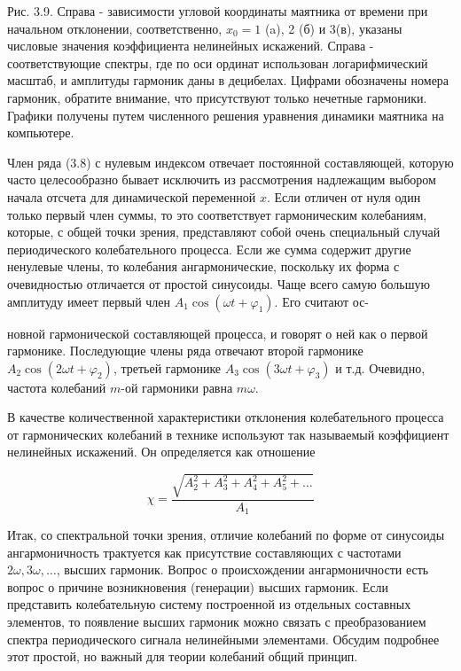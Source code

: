 \documentclass[10pt]{article}
\begin{document}
Рис. 3.9. Справа - зависимости угловой координаты маятника от времени при начальном отклонении, соответственно, $x_{0}=1$ (a), 2 (б) и 3(в), указаны числовые значения коэффициента нелинейных искажений. Справа - соответствующие спектры, где по оси ординат использован логарифмический масштаб, и амплитуды гармоник даны в децибелах. Цифрами обозначены номера гармоник, обратите внимание, что присутствуют только нечетные гармоники. Графики получены путем численного решения уравнения динамики маятника на компьютере.

Член ряда (3.8) с нулевым индексом отвечает постоянной составляющей, которую часто целесообразно бывает исключить из рассмотрения надлежащим выбором начала отсчета для динамической переменной $x$. Если отличен от нуля один только первый член суммы, то это соответствует гармоническим колебаниям, которые, с общей точки зрения, представляют собой очень специальный случай периодического колебательного процесса. Если же сумма содержит другие ненулевые члены, то колебания ангармонические, поскольку их форма с очевидностью отличается от простой синусоиды. Чаще всего самую большую амплитуду имеет первый член $A_{1} \cos \left(\omega t+\varphi_{1}\right)$. Его считают ос-

новной гармонической составляющей процесса, и говорят о ней как о первой гармонике. Последующие члены ряда отвечают второй гармонике $A_{2} \cos \left(2 \omega t+\varphi_{2}\right)$, третьей гармонике $A_{3} \cos \left(3 \omega t+\varphi_{3}\right)$ и т.д. Очевидно, частота колебаний $m$-ой гармоники равна $m \omega$.

В качестве количественной характеристики отклонения колебательного процесса от гармонических колебаний в технике используют так называемый коэффициент нелинейных искажений. Он определяется как отношение


\begin{equation*}
\chi=\frac{\sqrt{A_{2}^{2}+A_{3}^{2}+A_{4}^{2}+A_{5}^{2}+\ldots}}{A_{1}} \tag{3.11}
\end{equation*}


Итак, со спектральной точки зрения, отличие колебаний по форме от синусоиды ангармоничность трактуется как присутствие составляющих с частотами $2 \omega, 3 \omega, \ldots$, высших гармоник. Вопрос о происхождении ангармоничности есть вопрос о причине возникновения (генерации) высших гармоник. Если представить колебательную систему построенной из отдельных составных элементов, то появление высших гармоник можно связать с преобразованием спектра периодического сигнала нелинейными элементами. Обсудим подробнее этот простой, но важный для теории колебаний общий принцип.
\end{document}
